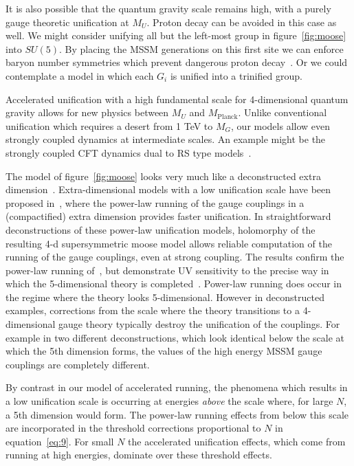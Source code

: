 \documentclass[a4paper,prl,twocolumn]{revtex4}
\begin{document}
It is also possible that the quantum gravity scale remains high, with
a purely gauge theoretic unification at $M_U$. Proton decay can be
avoided in this case as well.  We might consider unifying all but the
left-most group in figure~\ref{fig:moose} into $SU(5)$.  By placing
the MSSM generations on this first site we can enforce baryon number
symmetries which prevent dangerous proton decay~\cite{Weiner:2001pv}.
Or we could contemplate a model in which each $G_i$ is unified into a
trinified group.

Accelerated unification with a high fundamental scale for
4-dimensional quantum gravity allows for new physics between $M_U$ and
$M_{\text{Planck}}$. Unlike conventional unification which requires a
desert from 1 TeV to $M_G$, our models allow even strongly coupled
dynamics at intermediate scales. An example might be the strongly
coupled CFT dynamics  dual to RS type models~\cite{Randall:1999ee}.

The model of figure~\ref{fig:moose} looks very much like a
deconstructed extra dimension~\cite{Arkani-Hamed:2001ca,Hill:2000mu}.
Extra-dimensional models with a low unification scale have been
proposed in~\cite{Dienes:1998vh}, where the power-law running of the
gauge couplings in a (compactified) extra dimension provides faster
unification. In straightforward deconstructions of these power-law
unification models, holomorphy of the resulting 4-d supersymmetric
moose model allows reliable computation of the running of the gauge
couplings, even at strong coupling. The results confirm the power-law
running of~\cite{Dienes:1998vh}, but demonstrate UV sensitivity to the
precise way in which the 5-dimensional theory is
completed~\cite{comm}.  Power-law running does occur in the regime
where the theory looks 5-dimensional. However in deconstructed
examples, corrections from the scale where the theory transitions to a
4-dimensional gauge theory typically destroy the unification of the
couplings.  For example in two different deconstructions, which look
identical below the scale at which the 5th dimension forms, the values
of the high energy MSSM gauge couplings are completely different.

By contrast in our model of accelerated running, the phenomena which
results in a low unification scale is occurring at energies {\em
  above} the scale where, for large $N$, a 5th dimension would form.
The power-law running effects from below this scale are incorporated
in the threshold corrections proportional to $N$ in
equation~\eqref{eq:9}.  For small $N$ the accelerated unification
effects, which come from running at high energies, dominate over these
threshold effects.
\end{document}

